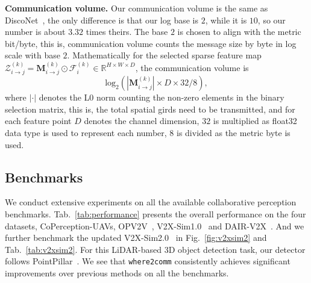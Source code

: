 \documentclass{article}
\begin{document}
\textbf{Communication volume.} Our communication volume is the same as DiscoNet~\cite{disconet}, the only difference is that our log base is $2$, while it is $10$, so our number is about $3.32$ times theirs. The base $2$ is chosen to align with the metric bit/byte, this is, communication volume counts the message size by byte in log scale with base $2$. Mathematically for the selected sparse feature map
$
    \mathcal{Z}_{i\rightarrow j}^{(k)}=\mathbf{M}_{i\rightarrow j}^{(k)}\odot \mathcal{F}_i^{(k)} \in \mathbb{R}^{H\times W \times D}
$, the communication volume is
\begin{equation}
    \text{log}_2\left(|\mathbf{M}_{i\rightarrow j}^{(k)}| \times D \times 32 / 8\right)\label{comm},
\end{equation}
where $|\cdot|$ denotes the L0 norm counting the non-zero elements in the binary selection matrix, this is, the total spatial girds need to be transmitted, and for each feature point $D$ denotes the channel dimension, $32$ is multiplied as float32 data type is used to represent each number, $8$ is divided as the metric byte is used. 



\subsection{Benchmarks}
We conduct extensive experiments on all the available collaborative perception benchmarks. Tab.~\ref{tab:performance} presents the overall performance on the four datasets, CoPerception-UAVs, OPV2V~\cite{OPV2V}, V2X-Sim1.0~\cite{disconet} and DAIR-V2X~\cite{dair}. And we further benchmark the updated V2X-Sim2.0~\cite{V2XSim} in Fig.~\ref{fig:v2xsim2} and Tab.~\ref{tab:v2xsim2}. For this LiDAR-based 3D object detection task, our detector follows PointPillar~\cite{PointPillar}. We see that \texttt{where2comm} consistently achieves significant improvements over previous methods on all the benchmarks.
\end{document}
